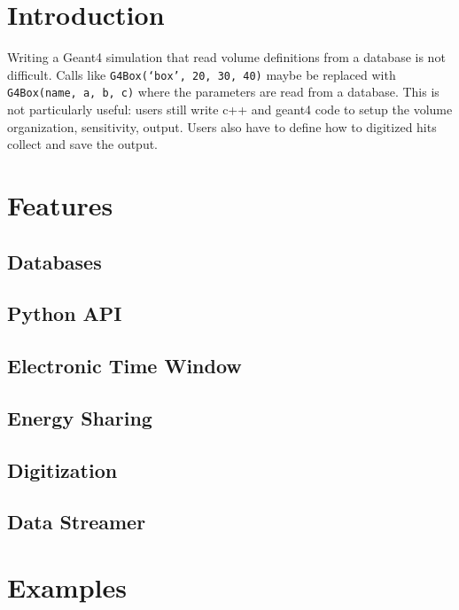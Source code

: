 \section{Introduction}
\label{sec:intro}

Writing a Geant4\cite{geant4} simulation that read volume definitions from a database is
not difficult. Calls like \verb|G4Box(‘box’, 20, 30, 40)| maybe be replaced with
\verb|G4Box(name, a, b, c)| where the parameters are read from a database.
This is not particularly useful: users still write c++ and geant4 code to setup
the volume organization, sensitivity, output.
Users also have to define how to digitized hits collect and save the output.


\section{Features}
\label{sec:features}

\subsection{Databases}
\label{subsec:databases}

\subsection{Python API}
\label{subsec:api}


\subsection{Electronic Time Window}
\label{subsec:time_window}

\subsection{Energy Sharing}
\label{subsec:energy_sharing}


\subsection{Digitization}
\label{subsec:digitization}

\subsection{Data Streamer}
\label{subsec:data_streamer}


\section{Examples}
\label{sec:examples}

